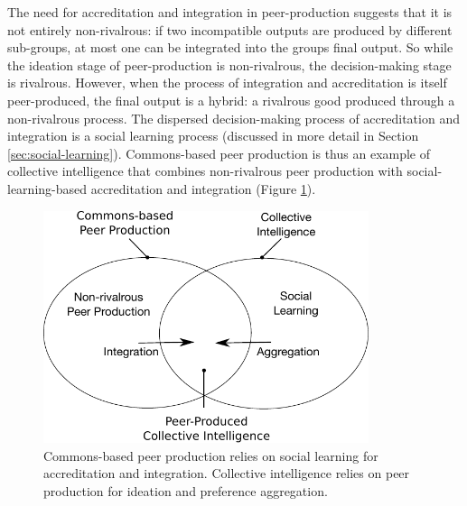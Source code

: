 The need for accreditation and integration in peer-production suggests that it is not entirely non-rivalrous: if two incompatible outputs are produced by different sub-groups, at most one can be integrated into the groups final output. So while the ideation stage of peer-production is non-rivalrous, the decision-making stage is rivalrous. However, when the process of integration and accreditation is itself peer-produced, the final output is a hybrid: a rivalrous good produced through a non-rivalrous process. The dispersed decision-making process of accreditation and integration is a social learning process (discussed in more detail in Section \ref{sec:social-learning}). Commons-based peer production is thus an example of collective intelligence that combines non-rivalrous peer production with social-learning-based accreditation and integration (Figure \ref{fig:peer-intelligence}).

\begin{figure}
\centering
\includegraphics[width=3.75in]{images/fig-peer-intelligence.pdf}
\caption{
Commons-based peer production relies on social learning for
accreditation and integration. Collective intelligence relies on peer
production for ideation and preference aggregation.\label{fig:peer-intelligence}
}
\end{figure}

